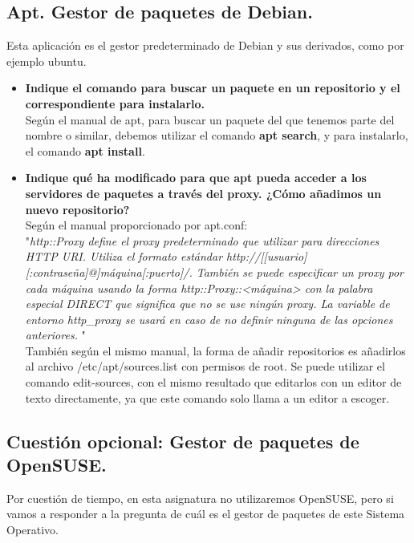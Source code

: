 \subsection{Apt. Gestor de paquetes de Debian.}
Esta aplicación es el gestor predeterminado de Debian y sus derivados, como por ejemplo ubuntu.
\begin{itemize}
	\item \textbf{Indique el comando para buscar un paquete en un repositorio y el correspondiente para instalarlo.}\\
	Según el manual de apt\cite{apt}, para buscar un paquete del que tenemos parte del nombre o similar, debemos utilizar el comando \textbf{apt search}, y para instalarlo, el comando \textbf{apt install}.
	
	
	 \item \textbf{Indique qué ha modificado para que apt pueda acceder a los servidores de paquetes a través del proxy. ¿Cómo añadimos un nuevo repositorio?}\\
	 Según el manual proporcionado por apt.conf\cite{apt.conf}:\\
	 
	 "\textit{http::Proxy define el proxy predeterminado que utilizar para direcciones HTTP URI. Utiliza el formato estándar
	 	http://[[usuario][:contraseña]@]máquina[:puerto]/. También se puede especificar un proxy por cada máquina usando la forma
	 	http::Proxy::<máquina> con la palabra especial DIRECT que significa que no se use ningún proxy. La variable de entorno http\_proxy
	 	se usará en caso de no definir ninguna de las opciones anteriores.
	 }"\\
	 
	 También según el mismo manual, la forma de añadir repositorios es añadirlos al archivo /etc/apt/sources.list con permisos de root. Se puede utilizar el comando edit-sources, con el mismo resultado que editarlos con un editor de texto directamente, ya que este comando solo llama a un editor a escoger\cite{apt}.
	 
\end{itemize}

\subsection{Cuestión opcional: Gestor de paquetes de OpenSUSE.}
Por cuestión de tiempo, en esta asignatura no utilizaremos OpenSUSE, pero si vamos a responder a la pregunta de cuál es el gestor de paquetes de este Sistema Operativo.\\


